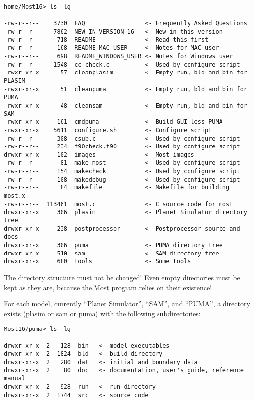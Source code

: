\begin{verbatim}
home/Most16> ls -lg

-rw-r--r--    3730  FAQ                 <- Frequently Asked Questions
-rw-r--r--    7862  NEW_IN_VERSION_16   <- New in this version
-rw-r--r--     718  README              <- Read this first
-rw-r--r--     168  README_MAC_USER     <- Notes for MAC user
-rw-r--r--     698  README_WINDOWS_USER <- Notes for Windows user
-rw-r--r--    1548  cc_check.c          <- Used by configure script
-rwxr-xr-x      57  cleanplasim         <- Empty run, bld and bin for PLASIM
-rwxr-xr-x      51  cleanpuma           <- Empty run, bld and bin for PUMA
-rwxr-xr-x      48  cleansam            <- Empty run, bld and bin for SAM
-rwxr-xr-x     161  cmdpuma             <- Build GUI-less PUMA
-rwxr-xr-x    5611  configure.sh        <- Configure script
-rw-r--r--     308  csub.c              <- Used by configure script
-rw-r--r--     234  f90check.f90        <- Used by configure script
drwxr-xr-x     102  images              <- Most images
-rw-r--r--      81  make_most           <- Used by configure script
-rw-r--r--     154  makecheck           <- Used by configure script
-rw-r--r--     108  makedebug           <- Used by configure script
-rw-r--r--      84  makefile            <- Makefile for building most.x
-rw-r--r--  113461  most.c              <- C source code for most
drwxr-xr-x     306  plasim              <- Planet Simulator directory tree
drwxr-xr-x     238  postprocessor       <- Postprocessor source and docs
drwxr-xr-x     306  puma                <- PUMA directory tree
drwxr-xr-x     510  sam                 <- SAM directory tree
drwxr-xr-x     680  tools               <- Some tools

\end{verbatim}

The directory structure must not be changed! Even empty directories must be
kept as they are, because the Most program relies on their existence!

For each model, currently ``Planet Simulator'', ``SAM'', and ``PUMA'', a directory exists
(plasim or sam or puma) with the following subdirectories:

\begin{verbatim}
Most16/puma> ls -lg

drwxr-xr-x  2   128  bin   <- model executables
drwxr-xr-x  2  1824  bld   <- build directory
drwxr-xr-x  2   280  dat   <- initial and boundary data
drwxr-xr-x  2    80  doc   <- documentation, user's guide, reference manual
drwxr-xr-x  2   928  run   <- run directory
drwxr-xr-x  2  1744  src   <- source code
\end{verbatim}

